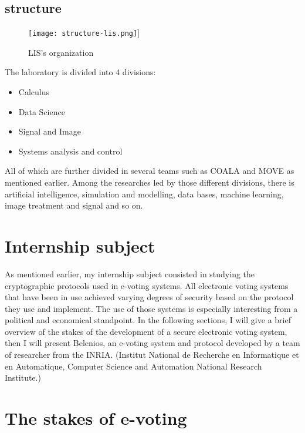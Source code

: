 \documentclass[12pt, a4paper]{report}
\begin{document}
\subsection{structure}

\begin{figure}[H]
\texttt{[image: structure-lis.png]}]
\caption{LIS's organization}
\label{Lis organization}
\end{figure}

The laboratory is divided into 4 divisions:
\begin{itemize}
\item Calculus
\item Data Science
\item Signal and Image
\item Systems analysis and control
\end{itemize}

All of which are further divided in several teams such as COALA and MOVE as mentioned earlier.
Among the researches led by those different divisions, there is artificial intelligence, simulation and modelling, data bases, machine learning, image treatment and signal and so on.


\section{Internship subject}

As mentioned earlier, my internship subject consisted in studying the cryptographic protocols used in e-voting systems. All electronic voting systems that have been in use achieved varying degrees of security based on the protocol they use and implement. The use of those systems is especially interesting from a political and economical standpoint. In the following sections, I will give a brief overview of the stakes of the development of a secure electronic voting system, then I will present Belenios, an e-voting system and protocol developed by a team of researcher from the INRIA. (Institut National de Recherche en Informatique et en Automatique, Computer Science and Automation National Research Institute.)

\section{The stakes of e-voting}
\end{document}
